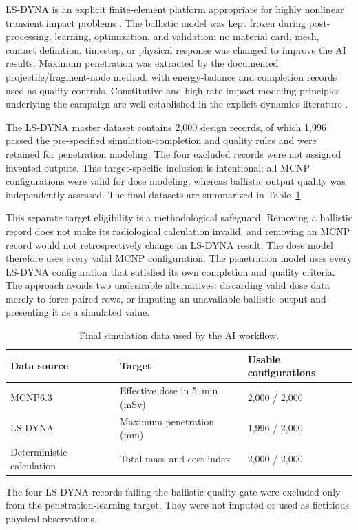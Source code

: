 \documentclass[12pt]{elsarticle}
\newcommand{\SI}[2]{#1~#2}
\begin{document}
	LS-DYNA is an explicit finite-element platform appropriate for highly nonlinear transient impact problems \cite{Hallquist2006}. The ballistic model was kept frozen during post-processing, learning, optimization, and validation: no material card, mesh, contact definition, timestep, or physical response was changed to improve the AI results. Maximum penetration was extracted by the documented projectile/fragment-node method, with energy-balance and completion records used as quality controls. Constitutive and high-rate impact-modeling principles underlying the campaign are well established in the explicit-dynamics literature \cite{JohnsonCook1983,JohnsonHolmquist1994,Meyers1994}.
	
	The LS-DYNA master dataset contains 2,000 design records, of which 1,996 passed the pre-specified simulation-completion and quality rules and were retained for penetration modeling. The four excluded records were not assigned invented outputs. This target-specific inclusion is intentional: all MCNP configurations were valid for dose modeling, whereas ballistic output quality was independently assessed. The final datasets are summarized in Table~\ref{tab:data}.
	
	This separate target eligibility is a methodological safeguard. Removing a ballistic record does not make its radiological calculation invalid, and removing an MCNP record would not retrospectively change an LS-DYNA result. The dose model therefore uses every valid MCNP configuration. The penetration model uses every LS-DYNA configuration that satisfied its own completion and quality criteria. The approach avoids two undesirable alternatives: discarding valid dose data merely to force paired rows, or imputing an unavailable ballistic output and presenting it as a simulated value.
	
	\begin{table}[htbp]
		\centering
		\caption{Final simulation data used by the AI workflow.}
		\label{tab:data}
		\begin{tabular}{@{}lll@{}}
			\toprule
			Data source & Target & Usable configurations \\
			\midrule
			MCNP6.3 & Effective dose in \SI{5}{min} (mSv) & 2,000 / 2,000 \\
			LS-DYNA & Maximum penetration (mm) & 1,996 / 2,000 \\
			Deterministic calculation & Total mass and cost index & 2,000 / 2,000 \\
			\bottomrule
		\end{tabular}
		\par\vspace{0.3em}\footnotesize\raggedright
		The four LS-DYNA records failing the ballistic quality gate were excluded only from the penetration-learning target. They were not imputed or used as fictitious physical observations.
	\end{table}
\end{document}
